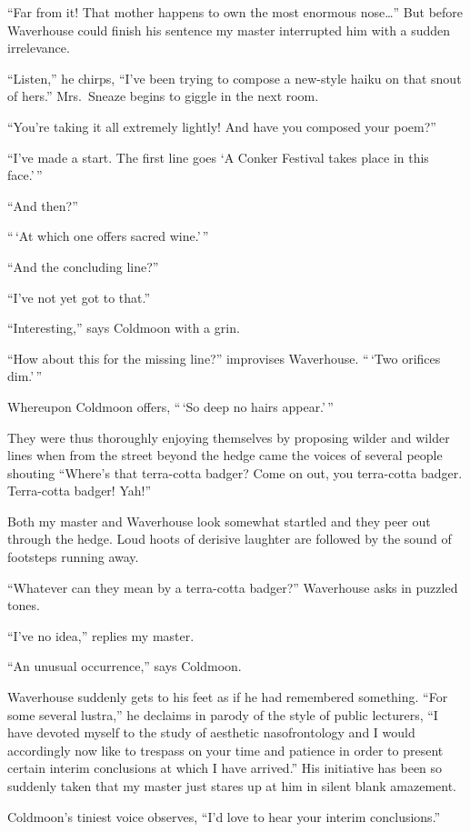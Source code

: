 \documentclass{book}
\begin{document}
``Far from it! That mother happens to own the most enormous
nose\ldots{}'' But before Waverhouse could finish his sentence my master
interrupted him with a sudden irrelevance.

``Listen,'' he chirps, ``I've been trying to compose a new-style haiku
on that snout of hers.'' Mrs.~Sneaze begins to giggle in the next room.

``You're taking it all extremely lightly! And have you composed your
poem?''

``I've made a start. The first line goes `A Conker Festival takes place
in this face.'\,''

``And then?''

``\,`At which one offers sacred wine.'\,''

``And the concluding line?''

``I've not yet got to that.''

``Interesting,'' says Coldmoon with a grin.

``How about this for the missing line?'' improvises Waverhouse. ``\,`Two
orifices dim.'\,''

Whereupon Coldmoon offers, ``\,`So deep no hairs appear.'\,''

They were thus thoroughly enjoying themselves by proposing wilder and
wilder lines when from the street beyond the hedge came the voices of
several people shouting ``Where's that terra-cotta badger? Come on out,
you terra-cotta badger. Terra-cotta badger! Yah!''

Both my master and Waverhouse look somewhat startled and they peer out
through the hedge. Loud hoots of derisive laughter are followed by the
sound of footsteps running away.

``Whatever can they mean by a terra-cotta badger?'' Waverhouse asks in
puzzled tones.

``I've no idea,'' replies my master.

``An unusual occurrence,'' says Coldmoon.

Waverhouse suddenly gets to his feet as if he had remembered something.
``For some several lustra,'' he declaims in parody of the style of
public lecturers, ``I have devoted myself to the study of aesthetic
nasofrontology and I would accordingly now like to trespass on your time
and patience in order to present certain interim conclusions at which I
have arrived.'' His initiative has been so suddenly taken that my master
just stares up at him in silent blank amazement.

Coldmoon's tiniest voice observes, ``I'd love to hear your interim
conclusions.''
\end{document}
